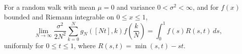 For a random walk with mean $\mu = 0$ and variance $0 < \sigma^2 < \infty$, and for $f(x)$ bounded and Riemann integrable on $0 \leq x \leq 1$,
$$\lim_{N \to \infty} \frac{\sigma^2}{2N^2} \sum_{k=0}^{N} g_N([Nt], k) f\left(\frac{k}{N}\right) = \int_0^1 f(s) R(s,t) \, ds,$$
uniformly for $0 \leq t \leq 1$, where $R(s,t) = \min(s,t) - st$.
